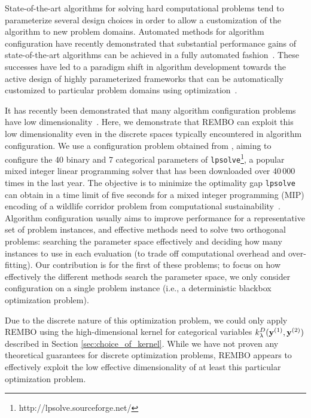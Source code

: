 \documentclass{article}
\begin{document}
State-of-the-art algorithms for solving hard computational problems tend to parameterize several design choices in order to allow a customization of the algorithm to new problem domains. Automated methods for algorithm configuration have recently demonstrated that substantial performance gains of state-of-the-art algorithms can be achieved in a fully automated fashion~\cite{Mockus:1999,Hutter:2010,Bergstra:2011,Wang:2011}. These successes have led to a paradigm shift in algorithm development towards the 
active design of highly parameterized frameworks that can be automatically customized to particular problem domains using optimization~\cite{Hoos:2012:PO:2076450.2076469,Bergstra:model_search}.

It has recently been demonstrated that many algorithm configuration problems have low dimensionality~\cite{Hutter:2013_KeyParameters}. 
Here, we demonstrate that REMBO can exploit this low dimensionality even in the discrete spaces typically encountered in algorithm configuration. 
We use a configuration problem obtained from \cite{Hutter:2010}, aiming to configure the 40 binary and 7 categorical parameters of \texttt{lpsolve}\footnote{http://lpsolve.sourceforge.net/}, a popular mixed integer linear programming solver that has been downloaded over 40\,000 times in the last year.
The objective is to minimize the optimality gap \texttt{lpsolve} can obtain in a time limit of five seconds for a mixed integer programming (MIP) encoding of a wildlife corridor problem from computational sustainability~\cite{ghs08:connection}.
Algorithm configuration usually aims to improve performance for a representative set of problem instances, and effective methods need to solve two orthogonal problems: searching the parameter space effectively and deciding how many instances to use in each evaluation (to trade off computational overhead and over-fitting). Our contribution is for the first of these problems; to focus on how effectively the different methods search the parameter space, we only consider configuration on a single problem instance (i.e., a deterministic blackbox optimization problem).

Due to the discrete nature of this optimization problem, we could only apply REMBO using the high-dimensional kernel for categorical variables $k^D_{\lambda}(\mathbf{y}^{(1)}, \mathbf{y}^{(2)})$ described in Section \ref{sec:choice_of_kernel}. While we have not proven any theoretical guarantees for discrete optimization problems, REMBO appears to effectively exploit the low effective dimensionality of at least this particular optimization problem.
\end{document}
